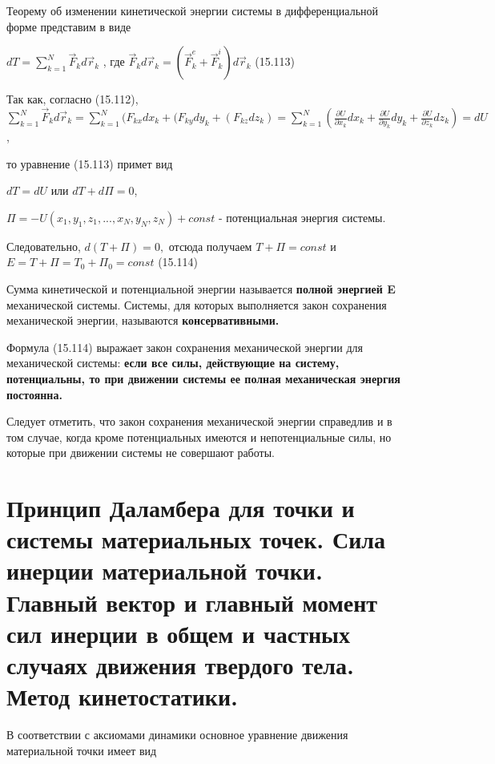 {\begin{center}
    \par Теорему об изменении кинетической энергии системы в дифференциальной форме представим в виде

    \par $dT = \sum_{k=1}^{N}\vec{F}_{k}d\vec{r}_{k}$ , где $\vec{F}_{k} d\vec{r}_{k} = ( \vec{F}_{k}^{e} + \vec{F}_{k}^{i} )d\vec{r}_{k} $ \qquad (15.113)

    \par Так как, согласно (15.112), $ \sum_{k=1}^{N} \vec{F}_{k}d\vec{r}_{k} =\sum_{k=1}^{N}(F_{kx}dx_{k} + (F_{ky}dy_{k} +(F_{kz}dz_{k} )= \sum_{k=1}^{N}(\frac{\partial U}{\partial x_{k}}dx_{k} + \frac{\partial U}{\partial y_{k}}dy_{k} + \frac{\partial U}{\partial z_{k}}dz_{k} ) = dU$,

    \par то уравнение (15.113) примет вид

    \par $dT=dU$ или $dT + d\Pi = 0$,

    \par $\Pi = -U(x_{1}, y_{1},z_{1},...,x_{N},y_{N},z_{N}) + const $ - потенциальная энергия системы.

    \par Следовательно, $d(T+\Pi)=0,$ отсюда получаем $T+\Pi = const$ и $E=T+\Pi =T_{0} + \Pi_{0}=const$ \qquad (15.114)

    \par Сумма кинетической и потенциальной энергии называется \textbf{полной энергией E} механической системы. Системы, для которых выполняется закон сохранения механической энергии, называются \textbf{консервативными.}

    \par Формула (15.114) выражает закон сохранения механической энергии для механической системы: \textbf{если все силы, действующие на систему, потенциальны, то при движении системы ее полная механическая энергия постоянна.}
    
    \par Следует отметить, что закон сохранения механической энергии справедлив и в том случае, когда кроме потенциальных имеются и непотенциальные силы, но которые при движении системы не совершают работы. 
    
\end{center}

\section{Принцип Даламбера для точки и системы материальных точек. Сила инерции материальной точки. Главный вектор и главный момент сил инерции в общем и частных случаях движения твердого тела. Метод кинетостатики.}
\begin{center}
    \par В  соответствии  с  аксиомами  динамики  основное  уравнение  движения материальной точки имеет вид


\end{center}}
